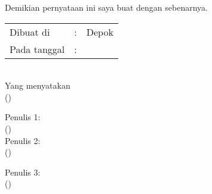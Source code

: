 \noindent Demikian pernyataan ini saya buat dengan sebenarnya.

\ifx\blank\npmDua\else\clearpage\fi



\begin{center}
	\vspace*{0.8cm}
	\begin{tabular}{lll}
		Dibuat di&: & Depok \\
		Pada tanggal&: & \tanggalSiapSidang \\
	\end{tabular}\\

	\vspace*{0.2cm}
	Yang menyatakan \\
	\ifx\blank\npmDua
		\vspace*{2cm}
		(\penulisSatu)
	\else
		\begin{multicols}{2}
			Penulis 1:\\
			\vspace*{2cm}
			(\penulisSatu)\\

			Penulis 2:\\
			\vspace*{2cm}
			(\penulisDua)\\
		\end{multicols}
	\fi
	\ifx\blank\npmTiga\else
		\vspace*{0.2cm}
		Penulis 3:\\
		\vspace*{2cm}
		(\penulisTiga)
	\fi
\end{center}

\newpage
